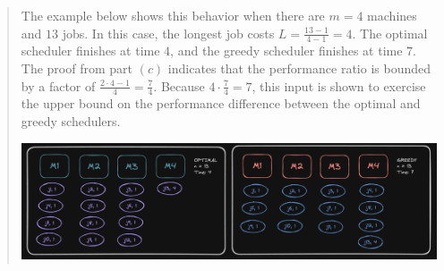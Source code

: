 \documentclass[11pt]{article}
\begin{document}
\begin{enumerate}
\begin{enumerate}
\begin{quote}
\medskip
The example below shows this behavior when there are $m = 4$ machines and $13$ jobs. In this case, the longest job costs $L = \frac{13 - 1}{4 - 1} = 4$. The optimal scheduler finishes at time $4$, and the greedy scheduler finishes at time $7$. The proof from part $(c)$ indicates that the performance ratio is bounded by a factor of $\frac{2 \cdot 4 - 1}{4} = \frac{7}{4}$. Because $4 \cdot \frac{7}{4} = 7$, this input is shown to exercise the upper bound on the performance difference between the optimal and greedy schedulers.

\medskip
\hspace*{-12em}
\includegraphics[scale=0.34]{./pics/q7d_scheduling.png}
\end{quote}
\end{enumerate}


\end{enumerate}
\end{document}
